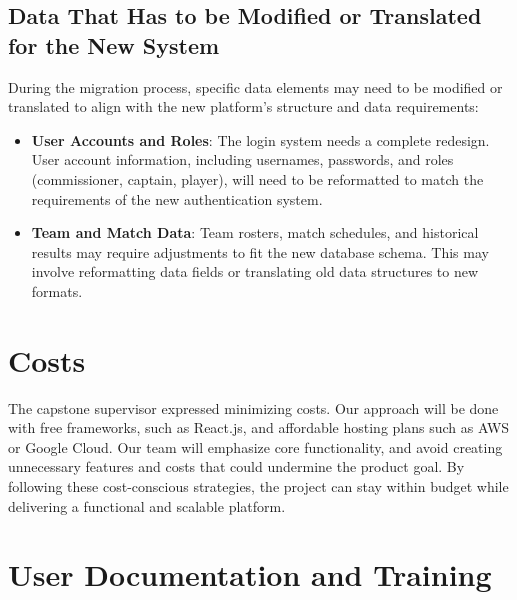 \documentclass[12pt]{article}
\begin{document}
\subsection{Data That Has to be Modified or Translated for the New System}
During the migration process, specific data elements may need to be modified or translated to align with the new platform's structure and data requirements:

\begin{itemize}
    \item \textbf{User Accounts and Roles}: The login system needs a complete redesign. User account information, including usernames, passwords, and roles (commissioner, captain, player), will need to be reformatted to match the requirements of the new authentication system.
    \item \textbf{Team and Match Data}: Team rosters, match schedules, and historical results may require adjustments to fit the new database schema. This may involve reformatting data fields or translating old data structures to new formats.
\end{itemize}

\section{Costs}
The capstone supervisor expressed minimizing costs. Our approach will be done with free frameworks, such as React.js, and affordable hosting plans such as AWS or Google Cloud. Our team will emphasize core functionality, and avoid creating unnecessary features and costs that could undermine the product goal. By following these cost-conscious strategies, the project can stay within budget while delivering a functional and scalable platform.

\section{User Documentation and Training}
\end{document}
